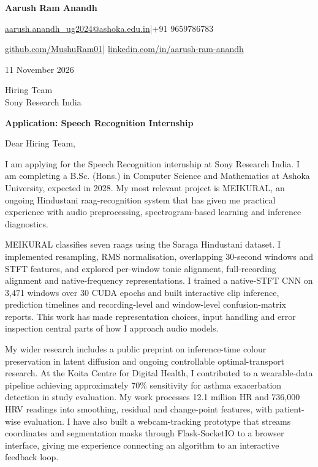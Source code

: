\documentclass[11pt,a4paper]{article}
\begin{document}
{\LARGE\bfseries Aarush Ram Anandh}\par\vspace{4pt}
\href{mailto:aarush.anandh_ug2024@ashoka.edu.in}{aarush.anandh\_ug2024@ashoka.edu.in}\quad|\quad +91 9659786783\par\vspace{2pt}
\href{https://github.com/MushuRam01}{github.com/MushuRam01}\quad|\quad
\href{https://www.linkedin.com/in/aarush-ram-anandh/}{linkedin.com/in/aarush-ram-anandh}\par
\vspace{20pt}
11 November 2026\par\vspace{12pt}
Hiring Team\\
Sony Research India\par\vspace{12pt}
\textbf{Application: Speech Recognition Internship}\par\vspace{14pt}
Dear Hiring Team,\par\vspace{10pt}
I am applying for the Speech Recognition internship at Sony Research India. I am completing a B.Sc. (Hons.) in Computer Science and Mathematics at Ashoka University, expected in 2028. My most relevant project is MEIKURAL, an ongoing Hindustani raag-recognition system that has given me practical experience with audio preprocessing, spectrogram-based learning and inference diagnostics.\par\vspace{10pt}
MEIKURAL classifies seven raags using the Saraga Hindustani dataset. I implemented resampling, RMS normalisation, overlapping 30-second windows and STFT features, and explored per-window tonic alignment, full-recording alignment and native-frequency representations. I trained a native-STFT CNN on 3,471 windows over 30 CUDA epochs and built interactive clip inference, prediction timelines and recording-level and window-level confusion-matrix reports. This work has made representation choices, input handling and error inspection central parts of how I approach audio models.\par\vspace{10pt}
My wider research includes a public preprint on inference-time colour preservation in latent diffusion and ongoing controllable optimal-transport research. At the Koita Centre for Digital Health, I contributed to a wearable-data pipeline achieving approximately 70\% sensitivity for asthma exacerbation detection in study evaluation. My work processes 12.1 million HR and 736,000 HRV readings into smoothing, residual and change-point features, with patient-wise evaluation. I have also built a webcam-tracking prototype that streams coordinates and segmentation masks through Flask-SocketIO to a browser interface, giving me experience connecting an algorithm to an interactive feedback loop.\par\vspace{10pt}
\end{document}
